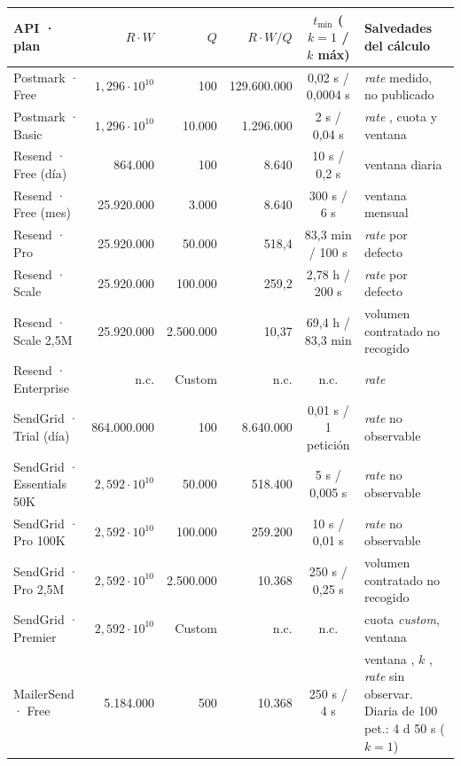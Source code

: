 \begin{table}[H]
\centering
\scriptsize
\setlength{\tabcolsep}{2.5pt}
\begin{tabular}{|l|r|r|r|c|p{3.2cm}|}
\hline
\textbf{API · plan} & \textbf{$R \cdot W$} & \textbf{$Q$} & \textbf{$R \cdot W / Q$} & \textbf{$t_{\min}$ ($k{=}1$ / $k$ máx)} & \textbf{Salvedades del cálculo} \\
\hline
Postmark · Free & $1{,}296 \cdot 10^{10}$ & 100 & 129.600.000 & 0,02 s / 0,0004 s & \textit{rate} medido, no publicado \semambar{} \\
\hline
Postmark · Basic & $1{,}296 \cdot 10^{10}$ & 10.000 & 1.296.000 & 2 s / 0,04 s & \textit{rate} \semambar{}, cuota y ventana \semambar{} \\
\hline
Resend · Free (día) & 864.000 & 100 & 8.640 & 10 s / 0,2 s & ventana diaria \semambar{} \\
\hline
Resend · Free (mes) & 25.920.000 & 3.000 & 8.640 & 300 s / 6 s & ventana mensual \semambar{} \\
\hline
Resend · Pro & 25.920.000 & 50.000 & 518,4 & 83,3 min / 100 s & \textit{rate} por defecto \\
\hline
Resend · Scale & 25.920.000 & 100.000 & 259,2 & 2,78 h / 200 s & \textit{rate} por defecto \\
\hline
Resend · Scale 2,5M & 25.920.000 & 2.500.000 & 10,37 & 69,4 h / 83,3 min & volumen contratado no recogido \\
\hline
Resend · Enterprise & n.c. & Custom & n.c. & n.c. & \textit{rate} \semrojo{} \\
\hline
SendGrid · Trial (día) & 864.000.000 & 100 & 8.640.000 & 0,01 s / 1 petición & \textit{rate} no observable \\
\hline
SendGrid · Essentials 50K & $2{,}592 \cdot 10^{10}$ & 50.000 & 518.400 & 5 s / 0,005 s & \textit{rate} no observable \\
\hline
SendGrid · Pro 100K & $2{,}592 \cdot 10^{10}$ & 100.000 & 259.200 & 10 s / 0,01 s & \textit{rate} no observable \\
\hline
SendGrid · Pro 2,5M & $2{,}592 \cdot 10^{10}$ & 2.500.000 & 10.368 & 250 s / 0,25 s & volumen contratado no recogido \\
\hline
SendGrid · Premier & $2{,}592 \cdot 10^{10}$ & Custom & n.c. & n.c. & cuota \textit{custom}, ventana \semambar{} \\
\hline
MailerSend · Free & 5.184.000 & 500 & 10.368 & 250 s / 4 s & ventana \semambar{}, $k$ \semambar{}, \textit{rate} sin observar. Diaria de 100 pet.: 4 d 50 s ($k{=}1$) \\

\end{tabular}
\end{table}
